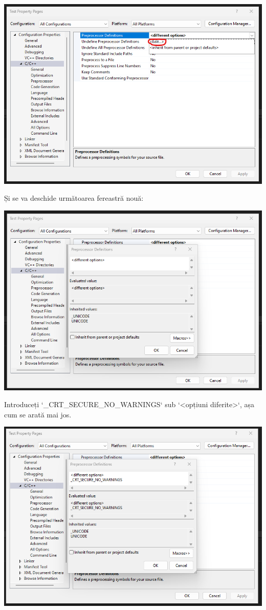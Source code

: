 \documentclass[../ro-fa-lab.tex]{subfiles}
\begin{document}
\includegraphics[width=\textwidth,alt={A screenshot of a computer Description automatically generated}]{./Resources/tutorial_lab9/image12.png}

Și se va deschide următoarea fereastră nouă:

\includegraphics[width=\textwidth,alt={A screenshot of a computer Description automatically generated}]{./Resources/tutorial_lab9/image13.png}

Introduceți `\_CRT\_SECURE\_NO\_WARNINGS` sub `\textless opțiuni diferite\textgreater`, așa cum se arată mai jos.

\includegraphics[width=\textwidth,alt={A screenshot of a computer Description automatically generated}]{./Resources/tutorial_lab9/image14.png}
\end{document}

